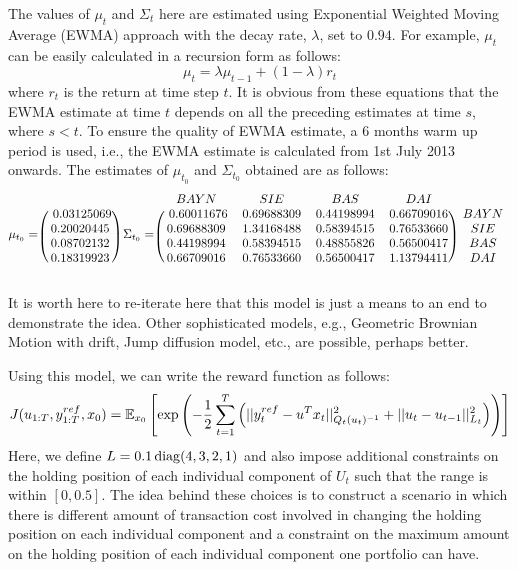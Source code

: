 The values of $\mu_t$ and $\Sigma_t$ here are estimated using Exponential Weighted Moving Average (EWMA) approach with the decay rate, $\lambda$, set to $0.94$. For example, $\mu_t$ can be easily calculated in a recursion form as follows:
\begin{equation}
  \mu_t = \lambda \mu_{t-1} + (1-\lambda) r_{t}
\end{equation}
where $r_t$ is the return at time step $t$. It is obvious from these equations that the EWMA estimate at time $t$ depends on all the preceding estimates at time $s$, where $s < t$. To ensure the quality of EWMA estimate, a 6 months warm up period is used, i.e., the EWMA estimate is calculated from 1st July 2013 onwards. The estimates of $\mu_{t_0}$ and $\Sigma_{t_0}$ obtained are as follows:
\begin{equation}
\mu_{t_0} =
\begin{blockarray}{c}
\\
\begin{block}{(c)}
~ 0.03125069 \\
0.20020445 \\
0.08702132 \\
0.18319923 \\
\end{block}
\end{blockarray}
~\Sigma_{t_0} =
\begin{blockarray}{ccccc}
  BAYN & SIE & BAS & DAI & \\
\begin{block}{(cccc)c}
 ~ 0.60011676 & 0.69688309 & 0.44198994 & 0.66709016 ~ & BAYN \\
0.69688309 & 1.34168488 & 0.58394515 & 0.76533660 & SIE \\
0.44198994 & 0.58394515 & 0.48855826 & 0.56500417 & BAS \\
0.66709016 & 0.76533660 & 0.56500417 & 1.13794411 & DAI \\
\end{block}
\end{blockarray}
\end{equation}
 
It is worth here to re-iterate here that this model is just a means to an end to demonstrate the idea. Other sophisticated models, e.g., Geometric Brownian Motion with drift, Jump diffusion model, etc., are possible, perhaps better.

Using this model, we can write the reward function as follows:
\begin{equation}
  J(u_{1:T},y^{ref}_{1:T}, x_0) = \operatorname{\mathbb{E}}_{x_0}\left[ \exp \left( -\dfrac{1}{2}\displaystyle\sum^T_{t=1}\left(\vert\vert y^{ref}_t - u^Tx_t \vert\vert^2_{Q_t(u_t)^{-1}}  + \vert\vert u_t - u_{t-1} \vert\vert^2_{L_t}\right) \right ) \right]
\end{equation}
Here, we define $L = 0.1\operatorname{diag}(4,3,2,1)$  and also impose additional constraints on the holding position of each individual component of $U_t$ such that the range is within $[0,0.5]$. The idea behind these choices is to construct a scenario in which there is different amount of transaction cost involved in changing the holding position on each individual component and a constraint on the maximum amount on the holding position of each individual component one portfolio can have.

